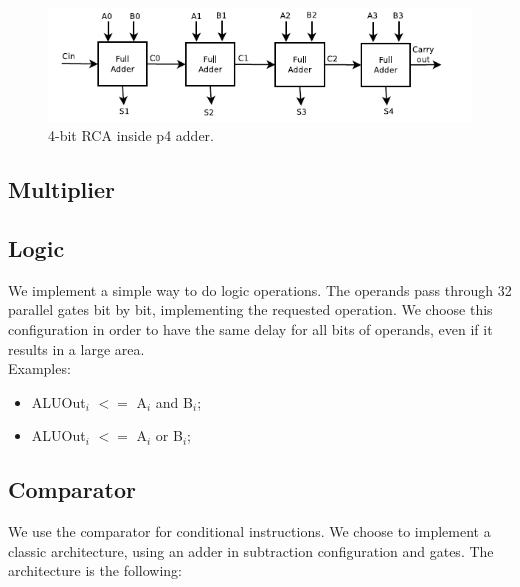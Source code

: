 \begin{figure}[h]
\centering
\includegraphics[scale = 0.7]{chapters/figures/rca} 
\caption{4-bit RCA inside p4 adder.}
\label{fig:rca}  %
\end{figure}

\FloatBarrier

\subsection{Multiplier}



\subsection{Logic}

We implement a simple way to do logic operations. The operands pass through 32 parallel gates bit by bit, implementing the requested operation. 
We choose this configuration in order to have the same delay for all bits of operands, even if it results in a large area.
\\Examples: 
\begin{itemize}
\item ALUOut$_{i}$ $<=$ A$_{i}$ and B$_{i}$;
\item ALUOut$_{i}$ $<=$ A$_{i}$ or B$_{i}$;
\end{itemize}

\subsection{Comparator}

We use the comparator for conditional instructions. We choose to implement a classic architecture, using an adder in
subtraction configuration and gates. The architecture is the following:

